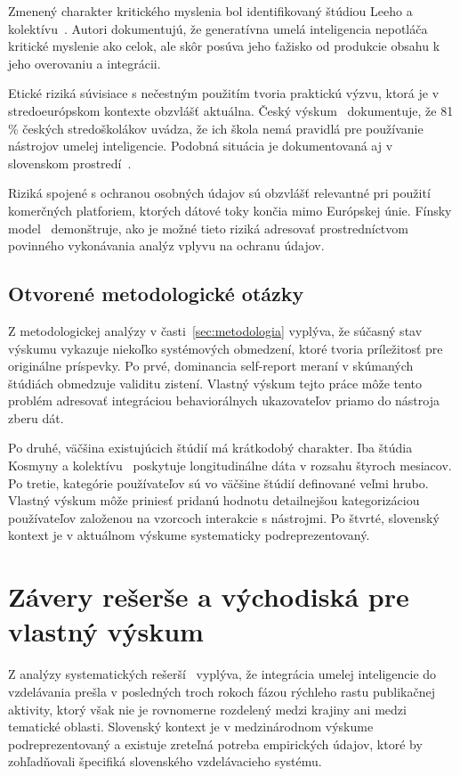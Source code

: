 Zmenený charakter kritického myslenia bol identifikovaný štúdiou Leeho a kolektívu~\cite{lee2025genai}. Autori dokumentujú, že generatívna umelá inteligencia nepotláča kritické myslenie ako celok, ale skôr posúva jeho ťažisko od produkcie obsahu k jeho overovaniu a integrácii.

Etické riziká súvisiace s nečestným použitím tvoria praktickú výzvu, ktorá je v stredoeurópskom kontexte obzvlášť aktuálna. Český výskum~\cite{kopecky2026inevitable} dokumentuje, že 81\,\% českých stredoškolákov uvádza, že ich škola nemá pravidlá pre používanie nástrojov umelej inteligencie. Podobná situácia je dokumentovaná aj v slovenskom prostredí~\cite{scio2025aikompas}.

Riziká spojené s ochranou osobných údajov sú obzvlášť relevantné pri použití komerčných platforiem, ktorých dátové toky končia mimo Európskej únie. Fínsky model~\cite{finland2025aieducation} demonštruje, ako je možné tieto riziká adresovať prostredníctvom povinného vykonávania analýz vplyvu na ochranu údajov.


\subsection{Otvorené metodologické otázky}

Z metodologickej analýzy v časti~\ref{sec:metodologia} vyplýva, že súčasný stav výskumu vykazuje niekoľko systémových obmedzení, ktoré tvoria príležitosť pre originálne príspevky. Po prvé, dominancia self-report meraní v skúmaných štúdiách obmedzuje validitu zistení. Vlastný výskum tejto práce môže tento problém adresovať integráciou behaviorálnych ukazovateľov priamo do nástroja zberu dát.

Po druhé, väčšina existujúcich štúdií má krátkodobý charakter. Iba štúdia Kosmyny a kolektívu~\cite{kosmyna2025brain} poskytuje longitudinálne dáta v rozsahu štyroch mesiacov. Po tretie, kategórie používateľov sú vo väčšine štúdií definované veľmi hrubo. Vlastný výskum môže priniesť pridanú hodnotu detailnejšou kategorizáciou používateľov založenou na vzorcoch interakcie s nástrojmi. Po štvrté, slovenský kontext je v aktuálnom výskume systematicky podreprezentovaný.


\section{Závery rešerše a východiská pre vlastný výskum}
\label{sec:zavery}


Z analýzy systematických rešerší~\cite{garzon2025systematic,hariyanto2025adaptive} vyplýva, že integrácia umelej inteligencie do vzdelávania prešla v posledných troch rokoch fázou rýchleho rastu publikačnej aktivity, ktorý však nie je rovnomerne rozdelený medzi krajiny ani medzi tematické oblasti. Slovenský kontext je v medzinárodnom výskume podreprezentovaný a existuje zreteľná potreba empirických údajov, ktoré by zohľadňovali špecifiká slovenského vzdelávacieho systému.

